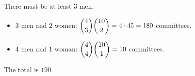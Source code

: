 There must be at least $3$ men.
\begin{itemize}
\item $3$ men and $2$ women: $\dbinom43\dbinom{10}2=4\cdot45=180$ committees.
\item $4$ men and $1$ woman: $\dbinom44\dbinom{10}1=10$ committees.
\end{itemize}
The total is $\boxed{190}$.
